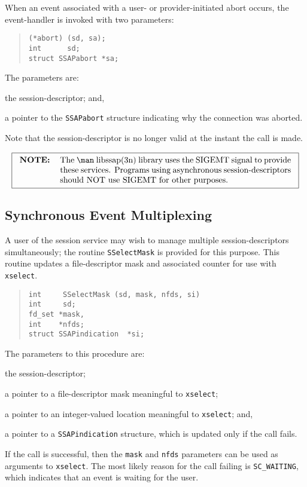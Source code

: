 When an event associated with a user- or provider-initiated abort occurs,
the event-handler is invoked with two parameters:
\begin{quote}\small\begin{verbatim}
(*abort) (sd, sa);
int      sd;
struct SSAPabort *sa;
\end{verbatim}\end{quote}
The parameters are:
\begin{describe}
\item[\verb"sd":] the session-descriptor;
and,

\item[\verb"sa":] a pointer to the \verb"SSAPabort" structure
indicating why the connection was aborted.
\end{describe}
Note that the session-descriptor is no longer valid at the instant the
call is made.

\[\fbox{\begin{tabular}{lp{0.8\textwidth}}
\bf NOTE:&	The \man libssap(3n) library uses the SIGEMT signal to provide
		these services.
		Programs using asynchronous session-descriptors should NOT
		use SIGEMT for other purposes.
\end{tabular}}\]

\subsection	{Synchronous Event Multiplexing}
A user of the session service may wish to manage multiple
session-de\-scrip\-tors simultaneously;
the routine \verb"SSelectMask" is provided for this purpose.
This routine updates a file-descriptor mask and associated counter for use
with \verb"xselect".
\begin{quote}\small\begin{verbatim}
int     SSelectMask (sd, mask, nfds, si)
int     sd;
fd_set *mask,
int    *nfds;
struct SSAPindication  *si;
\end{verbatim}\end{quote}
The parameters to this procedure are:
\begin{describe}
\item[\verb"sd":] the session-descriptor;

\item[\verb"mask":] a pointer to a file-descriptor mask meaningful to
\verb"xselect";

\item[\verb"nfds":] a pointer to an integer-valued location meaningful to
\verb"xselect";
and,

\item[\verb"si":] a pointer to a \verb"SSAPindication" structure, which is updated
only if the call fails.
\end{describe}
If the call is successful, then the \verb"mask" and \verb"nfds" parameters can
be used as arguments to \verb"xselect".
The most likely reason for the call failing is \verb"SC_WAITING",
which indicates that an event is waiting for the user.

